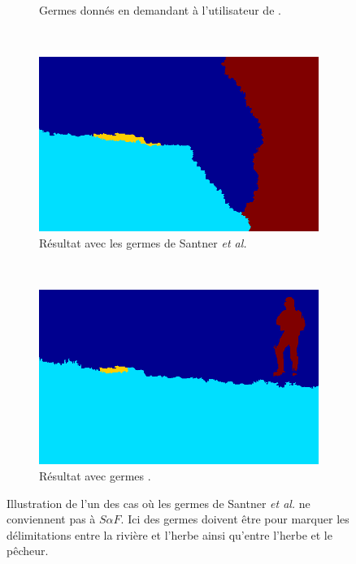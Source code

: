 \begin{figure}[htb]
\begin{subfigure}[t]{0.4\textwidth}
\caption{Germes donnés en demandant à l'utilisateur de .}
 \end{subfigure}
 \\
 \begin{subfigure}[t]{0.4\textwidth}	
\includegraphics[width=\textwidth]{images/evaluation/SeedsSantner/image_0011_9060_seeds_santner_res}
\caption{Résultat   avec les germes de Santner \textit{et al.}}
 \end{subfigure}
 ~
 \begin{subfigure}[t]{0.4\textwidth}	
\includegraphics[width=\textwidth]{images/evaluation/SeedsSantner/image_0011_9060_seeds_saf_res}
\caption{Résultat   avec  germes .}
 \end{subfigure}
\caption{Illustration de l'un des cas où les germes de Santner \textit{et al.} ne conviennent pas à $S \alpha F$. Ici des germes  doivent être  pour marquer les délimitations entre la rivière et l'herbe ainsi qu'entre l'herbe et le pêcheur. }
	\label{fig:eval:seedsSantner1}
\end{figure} 


